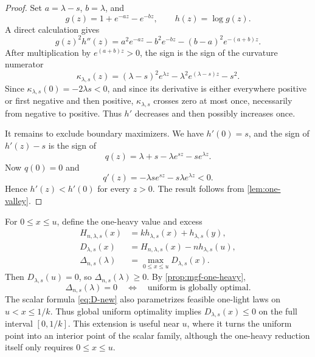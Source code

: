 \documentclass[11pt]{article}
\theoremstyle{plain}
\theoremstyle{definition}
\theoremstyle{remark}
\begin{document}
\begin{proof}
Set \(a=\lambda-s\), \(b=\lambda\), and
\[
g(z)=1+e^{-az}-e^{-bz},\qquad h(z)=\log g(z).
\]
A direct calculation gives
\begin{equation}\label{eq:hsecond}
g(z)^2h''(z)
=a^2e^{-az}-b^2e^{-bz}-(b-a)^2e^{-(a+b)z}.
\end{equation}
After multiplication by \(e^{(a+b)z}>0\), the sign is the sign of the curvature numerator
\begin{equation}\label{eq:kappa-curvature}
\kappa_{\lambda,s}(z)
=(\lambda-s)^2e^{\lambda z}
-\lambda^2e^{(\lambda-s)z}-s^2.
\end{equation}
Since \(\kappa_{\lambda,s}(0)=-2\lambda s<0\), and since its derivative is either everywhere positive or first negative and then positive, \(\kappa_{\lambda,s}\) crosses zero at most once, necessarily from negative to positive.  Thus \(h'\) decreases and then possibly increases once.

It remains to exclude boundary maximizers.  We have \(h'(0)=s\), and the sign of \(h'(z)-s\) is the sign of
\[
q(z)=\lambda+s-\lambda e^{sz}-s e^{\lambda z}.
\]
Now \(q(0)=0\) and
\[
q'(z)=-\lambda s e^{sz}-s\lambda e^{\lambda z}<0.
\]
Hence \(h'(z)<h'(0)\) for every \(z>0\).  The result follows from \cref{lem:one-valley}.
\end{proof}

For \(0\le x\le u\), define the one-heavy value and excess
\begin{align}
H_{n,\lambda,s}(x)
&=kh_{\lambda,s}(x)+h_{\lambda,s}(y),\label{eq:H-new}\\
D_{\lambda,s}(x)
&=H_{n,\lambda,s}(x)-nh_{\lambda,s}(u),\label{eq:D-new}\\
\Delta_{n,s}(\lambda)
&=\max_{0\le x\le u}D_{\lambda,s}(x).\label{eq:Delta-new}
\end{align}
Then \(D_{\lambda,s}(u)=0\), so \(\Delta_{n,s}(\lambda)\ge0\).  By \cref{prop:mgf-one-heavy},
\begin{equation}\label{eq:Delta-detects}
\Delta_{n,s}(\lambda)=0
\quad\Longleftrightarrow\quad
\text{uniform is globally optimal}.
\end{equation}
The scalar formula \eqref{eq:D-new} also parametrizes feasible one-light laws on \(u<x\le1/k\).  Thus global uniform optimality implies \(D_{\lambda,s}(x)\le0\) on the full interval \([0,1/k]\).  This extension is useful near \(u\), where it turns the uniform point into an interior point of the scalar family, although the one-heavy reduction itself only requires \(0\le x\le u\).
\end{document}
